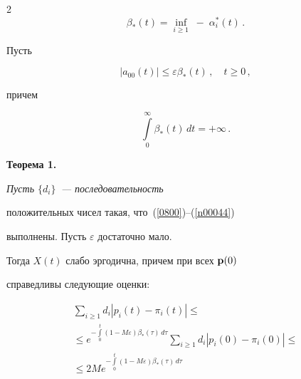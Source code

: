 \begin{multicols}{2}
\begin{equation*}


\beta_* (t) = \inf_{ i \ge 1}\;-\;\alpha_i^*(t)\,.




\end{equation*}


Пусть


\begin{equation}


|a_{00}(t)| \le \varepsilon \beta_* (t)\,,\quad t \ge 0\,,


\label{n00041}


\end{equation}


причем


\begin{equation}


\int\limits_0^{\infty} \beta_* (t)\,dt = +\infty \label{n00044}\,.


\end{equation}





\medskip





\noindent


{\bf Теорема 1. } {\it Пусть $\{d_i\}$~--- последовательность


положительных чисел такая, что~(\ref{0800})--(\ref{n00044})


выполнены. Пусть $\varepsilon$ достаточно мало.


Тогда $X(t)$ слабо эргодична, причем при всех   ${\bf p}(0)$


справедливы следующие оценки:


\begin{multline}


\sum_{i \ge 1} d_i \left|p_i(t) -


\pi_i(t)\right| \le{}\\


{}\le  e^{-\int\limits_0^t\left(1- M\varepsilon\right)


\beta_* (\tau)\, d\tau} \sum_{i \ge 1} d_i \left|p_i(0) -


\pi_i(0)\right| \le{}\\


{}\le


2M


e^{-\int\limits_0^t\left(1- M\varepsilon\right) \beta_* (\tau)\, d\tau}



\end{multline}}
\end{multicols}
